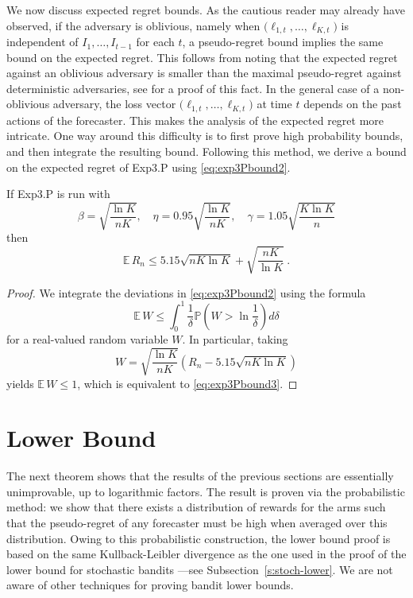 \documentclass[11pt]{hackednow}
\renewcommand{\P}{\mathbb{P}}
\newcommand{\E}{\mathbb{E}}
\begin{document}
We now discuss expected regret bounds. As the cautious reader may already have observed, if the adversary is oblivious, namely when $\bigl(\ell_{1,t}, \hdots, \ell_{K,t}\bigr)$ is independent of $I_1, \hdots, I_{t-1}$ for each $t$, a pseudo-regret bound implies the same bound on the expected regret. This follows from noting that the expected regret against an oblivious adversary is smaller than the maximal pseudo-regret against deterministic adversaries, see \cite[Proposition 33]{AB10} for a proof of this fact. In the general case of a non-oblivious adversary, the loss vector $\bigl(\ell_{1,t}, \hdots, \ell_{K,t}\bigr)$ at time $t$ depends on the past actions of the forecaster. This makes the analysis of the expected regret more intricate. One way around this difficulty is to first prove high probability bounds, and then integrate the resulting bound. Following this method, we derive a bound on the expected regret of Exp3.P using \eqref{eq:exp3Pbound2}.
\begin{theorem}
If Exp3.P is run with
\[
    \beta = \sqrt{\frac{\ln K }{n K}}, \quad \eta = 0.95 \sqrt{\frac{\ln K }{n K}}, \quad \gamma = 1.05 \sqrt{\frac{K \ln K }{n}}
\]
then
\begin{equation} \label{eq:exp3Pbound3}
\E\,R_n \leq 5.15 \sqrt{n K \ln K} + \sqrt{\frac{n K}{\ln K }}~.
\end{equation}
\end{theorem}
\begin{proof}
We integrate the deviations in \eqref{eq:exp3Pbound2} using the formula
\[
    \E\,W \leq \int_{0}^1 \frac{1}{\delta} \P\left(W>\ln\frac{1}{\delta}\right) d\delta
\]
for a real-valued random variable $W$. In particular, taking
\[
    W=\sqrt{\frac{\ln K }{n K}} \left(R_n - 5.15 \sqrt{n K \ln K }\right)
\]
yields $\E\,W \leq 1$, which is equivalent to \eqref{eq:exp3Pbound3}.
\end{proof}

\section{Lower Bound} \label{sec:LB}
The next theorem shows that the results of the previous sections are essentially unimprovable, up to logarithmic factors. The result is proven via the probabilistic method: we show that there exists a distribution of rewards for the arms such that the pseudo-regret of any forecaster must be high when averaged over this distribution. Owing to this probabilistic construction, the lower bound proof is based on the same Kullback-Leibler divergence as the one used in the proof of the lower bound for stochastic bandits ---see Subsection~\ref{s:stoch-lower}. We are not aware of other techniques for proving bandit lower bounds.
\end{document}
